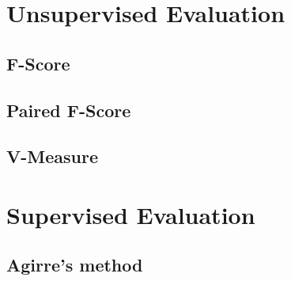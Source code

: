 
\section{Unsupervised Evaluation}
\subsection{F-Score}

\subsection{Paired F-Score}

\subsection{V-Measure}
\section{Supervised Evaluation}

\subsection{Agirre’s method}


